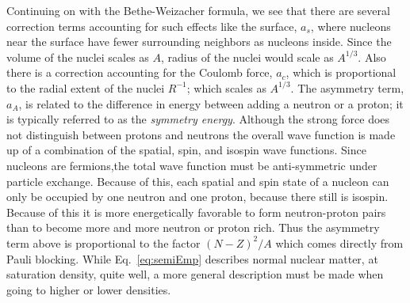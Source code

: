 Continuing on with the Bethe-Weizacher formula, we see that there are several correction terms accounting for such effects like the surface, $a_s$, where nucleons near the surface have fewer surrounding neighbors as nucleons inside. Since the volume of the nuclei scales as $A$, radius of the nuclei would scale as $A^{1/3}$. Also there is a correction accounting for the Coulomb force, $a_c$, which is proportional to the radial extent of the nuclei $R^{-1}$; which scales as $A^{1/3}$. The asymmetry term, $a_A$, is related to the difference in energy between adding a neutron or a proton; it is typically referred to as the \emph{symmetry energy}. Although the strong force does not distinguish between protons and neutrons the overall wave function is made up of a combination of the spatial, spin, and isospin wave functions. Since nucleons are fermions,the total wave function must be anti-symmetric under particle exchange. Because of this, each spatial and spin state of a nucleon can only be occupied by one neutron and one proton, because there still is isospin.  Because of this it is more energetically favorable to form neutron-proton pairs than to become more and more neutron or proton rich. Thus the asymmetry term above is proportional to the factor $(N - Z)^2/A$ which comes directly from Pauli blocking. While Eq.~\ref{eq:semiEmp} describes normal nuclear matter, at saturation density, quite well, a more general description must be made when going to higher or lower densities. 


